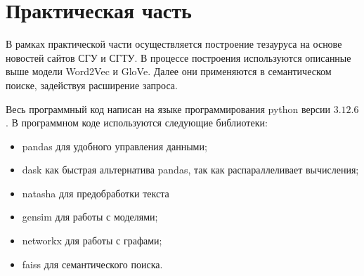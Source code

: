 \documentclass[coursework]{SCWorks}
\begin{document}

    
    



\section{Практическая часть}
В рамках практической части осуществляется построение тезауруса на основе новостей сайтов СГУ и СГТУ. В процессе построения используются описанные выше модели Word2Vec и GloVe. Далее они применяются в семантическом поиске, задействуя расширение запроса.

Весь программный код написан на языке программирования python версии $3.12.6$. В программном коде используются следующие библиотеки:
\begin{itemize}
  \item pandas для удобного управления данными;
  \item dask как быстрая альтернатива pandas, так как распараллеливает вычисления;
  \item natasha для предобработки текста
  \item gensim для работы с моделями;
  \item networkx для работы с графами;
  \item faiss для семантического поиска.
\end{itemize}
\end{document}
